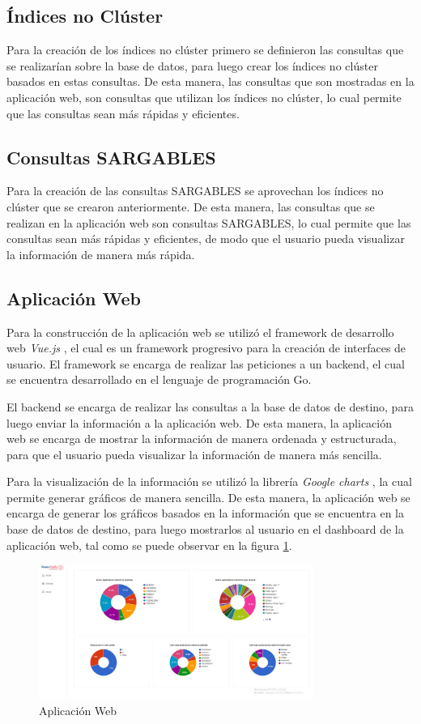 \subsection{Índices no Clúster}

Para la creación de los índices no clúster primero se definieron las consultas 
que se realizarían sobre la base de datos, para luego crear los índices no 
clúster basados en estas consultas. De esta manera, las consultas que 
son mostradas en la aplicación web, son consultas que utilizan los índices no 
clúster, lo cual permite que las consultas sean más rápidas y eficientes.

\subsection{Consultas SARGABLES}

Para la creación de las consultas SARGABLES se aprovechan los índices no 
clúster que se crearon anteriormente. De esta manera, las consultas que se 
realizan en la aplicación web son consultas SARGABLES, lo cual permite que 
las consultas sean más rápidas y eficientes, de modo que el usuario pueda
visualizar la información de manera más rápida.

\subsection{Aplicación Web}

Para la construcción de la aplicación web se utilizó el framework de desarrollo 
web \textit{Vue.js} \cite{You}, el cual es un framework progresivo para la creación de 
interfaces de usuario. El framework se encarga de realizar las peticiones a un 
backend, el cual se encuentra desarrollado en el lenguaje de programación Go.

El backend se encarga de realizar las consultas a la base de datos de destino, 
para luego enviar la información a la aplicación web. De esta manera, la 
aplicación web se encarga de mostrar la información de manera ordenada y 
estructurada, para que el usuario pueda visualizar la información de manera 
más sencilla.

Para la visualización de la información se utilizó la librería \textit{Google charts}
\cite{Google}, la cual permite generar gráficos de manera sencilla. De esta manera,
la aplicación web se encarga de generar los gráficos basados en la información 
que se encuentra en la base de datos de destino, para luego mostrarlos al 
usuario en el dashboard de la aplicación web, tal como se puede observar en la 
figura \ref{fig:web-app}.

\begin{figure}[H]
    \centering
    \includegraphics[width=0.8\textwidth]{img/web-app.jpg}
    \caption{Aplicación Web}
    \label{fig:web-app}
\end{figure}
